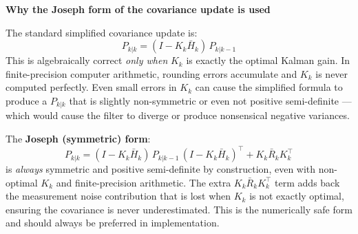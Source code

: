 \documentclass[12pt, a4paper]{article}
\begin{document}
\begin{notebox}
  \textbf{Why the Joseph form of the covariance update is used}

  The standard simplified covariance update is:
  \[
    P_{k|k} = (I - K_k \bar{H}_k)\, P_{k|k-1}
  \]
  This is algebraically correct \emph{only when} $K_k$ is exactly the
  optimal Kalman gain.
  In finite-precision computer arithmetic, rounding errors accumulate
  and $K_k$ is never computed perfectly.
  Even small errors in $K_k$ can cause the simplified formula to produce
  a $P_{k|k}$ that is slightly non-symmetric or even not positive
  semi-definite --- which would cause the filter to diverge or produce
  nonsensical negative variances.

  The \textbf{Joseph (symmetric) form}:
  \[
    P_{k|k} = (I - K_k \bar{H}_k)\, P_{k|k-1}\, (I - K_k \bar{H}_k)^\top
              + K_k \bar{R}_k K_k^\top
  \]
  is \emph{always} symmetric and positive semi-definite by construction,
  even with non-optimal $K_k$ and finite-precision arithmetic.
  The extra $K_k \bar{R}_k K_k^\top$ term adds back the measurement noise
  contribution that is lost when $K_k$ is not exactly optimal, ensuring
  the covariance is never underestimated.
  This is the numerically safe form and should always be preferred in
  implementation.
\end{notebox}
\end{document}
